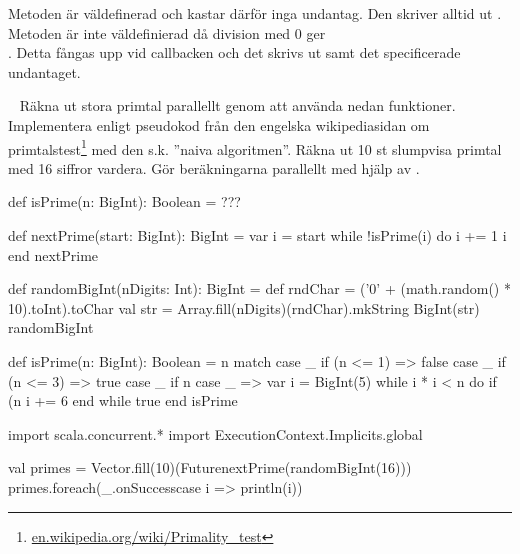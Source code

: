 \SubtaskSolved  Metoden  är väldefinerad och kastar därför inga undantag. Den skriver alltid ut \code{:)}. Metoden  är inte väldefinierad då division med 0 ger \\. Detta fångas upp vid callbacken och det skrivs ut \code{:(} samt det specificerade undantaget.

\ExtraTasks %


\QUESTEND






\WHAT{}

\QUESTBEGIN

\Task  \what~ Räkna ut stora primtal parallellt genom att använda nedan funktioner. Implementera  enligt pseudokod från den engelska wikipediasidan om primtalstest\footnote{\href{https://en.wikipedia.org/wiki/Primality_test}{en.wikipedia.org/wiki/Primality\_test}} med den s.k. ''naiva algoritmen''.  Räkna ut 10 st slumpvisa primtal med 16 siffror vardera. Gör beräkningarna parallellt med hjälp av .

\begin{Code}
def isPrime(n: BigInt): Boolean = ???

def nextPrime(start: BigInt): BigInt = 
  var i = start
  while !isPrime(i) do i += 1 
  i
end nextPrime

def randomBigInt(nDigits: Int): BigInt = 
   def rndChar = ('0' + (math.random() * 10).toInt).toChar
   val str = Array.fill(nDigits)(rndChar).mkString
   BigInt(str)
randomBigInt
\end{Code}

\SOLUTION


\TaskSolved \what

\begin{Code}
def isPrime(n: BigInt): Boolean = n match 
  case _ if (n <= 1) => false
  case _ if (n <= 3) => true
  case _ if n %
  case _ =>
    var i = BigInt(5)
    while i * i < n do
      if (n %
      i += 6
    end while
    true
end isPrime

import scala.concurrent.*
import ExecutionContext.Implicits.global

val primes = Vector.fill(10)(Future{nextPrime(randomBigInt(16))})
primes.foreach(_.onSuccess{case i => println(i)})
\end{Code}


\QUESTEND






